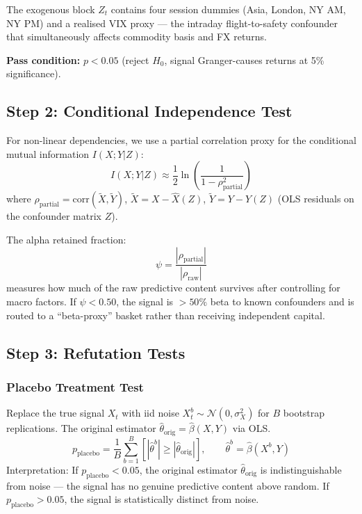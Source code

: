 \documentclass[11pt]{article}
\begin{document}
The exogenous block $Z_t$ contains four session dummies (Asia, London, NY AM, NY PM) and a realised VIX proxy --- the intraday flight-to-safety confounder that simultaneously affects commodity basis and FX returns.

\textbf{Pass condition:} $p < 0.05$ (reject $H_0$, signal Granger-causes returns at 5\% significance).

\subsection{Step 2: Conditional Independence Test}

For non-linear dependencies, we use a partial correlation proxy for the conditional mutual information $I(X;Y|Z)$:
\begin{equation}
I(X;Y|Z) \approx \frac{1}{2}\ln\left(\frac{1}{1-\rho_{\text{partial}}^2}\right)
\label{eq:cmi-proxy}
\end{equation}
where $\rho_{\text{partial}} = \text{corr}(\tilde{X}, \tilde{Y})$, $\tilde{X} = X - \hat{X}(Z)$, $\tilde{Y} = Y - \hat{Y}(Z)$ (OLS residuals on the confounder matrix $Z$).

The alpha retained fraction:
\begin{equation}
\psi = \frac{|\rho_{\text{partial}}|}{|\rho_{\text{raw}}|}
\label{eq:alpha-retained}
\end{equation}
measures how much of the raw predictive content survives after controlling for macro factors. If $\psi < 0.50$, the signal is $> 50\%$ beta to known confounders and is routed to a ``beta-proxy'' basket rather than receiving independent capital.

\subsection{Step 3: Refutation Tests}

\subsubsection{Placebo Treatment Test}

Replace the true signal $X_t$ with iid noise $X_t^b \sim \mathcal{N}(0, \sigma_X^2)$ for $B$ bootstrap replications. The original estimator $\hat{\theta}_{\text{orig}} = \hat{\beta}(X,Y)$ via OLS.
\begin{equation}
p_{\text{placebo}} = \frac{1}{B}\sum_{b=1}^{B}\left[|\hat{\theta}^b| \geq |\hat{\theta}_{\text{orig}}|\right], \qquad \hat{\theta}^b = \hat{\beta}(X^b, Y)
\label{eq:placebo}
\end{equation}
Interpretation: If $p_{\text{placebo}} < 0.05$, the original estimator $\hat{\theta}_{\text{orig}}$ is indistinguishable from noise --- the signal has no genuine predictive content above random. If $p_{\text{placebo}} > 0.05$, the signal is statistically distinct from noise.
\end{document}
